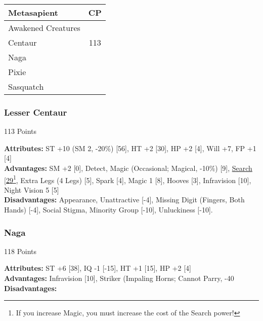 \begin{multicols*}{3}
	\begin{center}
		\begin{tabularx}{0.32\textwidth}{|X|c|}
			\hline
			Metasapient & CP \\
			\hline
			\hline
			Awakened Creatures & \\
			\hline
			Centaur & 113 \\
			Naga & \\
			Pixie & \\
			Sasquatch & \\
			\hline
		\end{tabularx}
	\end{center}
	
	\subsubsection*{Lesser Centaur}
	\begin{flushright}
		113 Points
	\end{flushright}
	\textbf{Attributes:}
	ST +10 (SM 2, -20\%) [56], HT +2 [30], HP +2 [4], Will +7, FP +1 [4]
	\\\textbf{Advantages:}
	SM +2 [0], Detect, Magic (Occasional; Magical, -10\%) [9], \hyperref[search]{Search [29}\footnote{If you increase Magic, you must increase the cost of the Search power!}, Extra Legs (4 Legs) [5], Spark [4], Magic 1 [8], Hooves [3], Infravision [10], Night Vision 5 [5]
	\\\textbf{Disadvantages:} 
	Appearance, Unattractive [-4], Missing Digit (Fingers, Both Hands) [-4], Social Stigma, Minority Group [-10], Unluckiness [-10].
	
	\subsubsection*{Naga}
	\begin{flushright}
		118 Points
	\end{flushright}
	\textbf{Attributes:} 
	ST +6 [38], IQ -1 [-15], HT +1 [15], HP +2 [4]
	\\\textbf{Advantages:} 
	Infravision [10], Striker (Impaling Horns; Cannot Parry, -40%
	\\\textbf{Disadvantages:} 
	

\end{multicols*}
